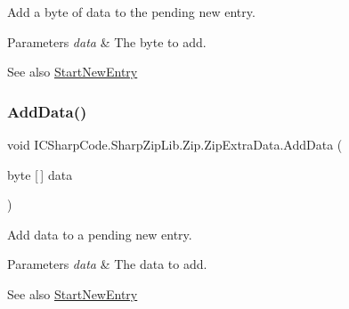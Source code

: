 Add a byte of data to the pending new entry. 


\begin{DoxyParams}{Parameters}
{\em data} & The byte to add.\\
\hline
\end{DoxyParams}
\begin{DoxySeeAlso}{See also}
\hyperlink{class_i_c_sharp_code_1_1_sharp_zip_lib_1_1_zip_1_1_zip_extra_data_a3fd5ac216b1b6a0fe5ae92ea8156f20a}{Start\+New\+Entry}


\end{DoxySeeAlso}
\mbox{\label{class_i_c_sharp_code_1_1_sharp_zip_lib_1_1_zip_1_1_zip_extra_data_aadf236a3ef6fc9c6a033ca14f931734c}} 
\subsubsection{\texorpdfstring{Add\+Data()}{AddData()}\hspace{0.1cm}{\footnotesize\ttfamily [4/4]}}
{\footnotesize\ttfamily void I\+C\+Sharp\+Code.\+Sharp\+Zip\+Lib.\+Zip.\+Zip\+Extra\+Data.\+Add\+Data (\begin{DoxyParamCaption}\item[{byte \mbox{[}$\,$\mbox{]}}]{data }\end{DoxyParamCaption})\hspace{0.3cm}{\ttfamily [inline]}}



Add data to a pending new entry. 


\begin{DoxyParams}{Parameters}
{\em data} & The data to add.\\
\hline
\end{DoxyParams}
\begin{DoxySeeAlso}{See also}
\hyperlink{class_i_c_sharp_code_1_1_sharp_zip_lib_1_1_zip_1_1_zip_extra_data_a3fd5ac216b1b6a0fe5ae92ea8156f20a}{Start\+New\+Entry}


\end{DoxySeeAlso}
\mbox{\label{class_i_c_sharp_code_1_1_sharp_zip_lib_1_1_zip_1_1_zip_extra_data_a86f3cb0b8dcd274f0bc84d75e06ba703}} 

